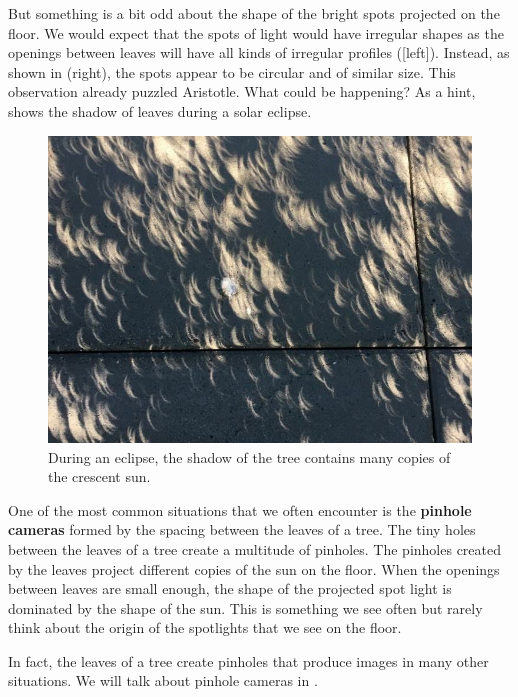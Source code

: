 But something is a bit odd about the shape of the bright spots projected on the floor. We would expect that the spots of light would have irregular shapes as the openings between leaves will have all kinds of irregular profiles (\fig{\ref{fig:tree_pinholes}}[left]). Instead, as shown in \fig{\ref{fig:tree_pinholes}}(right), the spots appear to be circular and of similar size. This observation already puzzled Aristotle. What could be happening?  As a hint, \fig{\ref{fig:tree_shadow_eclipse}} shows the shadow of leaves during a solar eclipse.


\begin{figure}[h!]
\centerline{
    \includegraphics[width=.9\linewidth]{figures/visionscience/tree_shadow_eclipse2.jpg} %
}
\caption{During an eclipse, the shadow of the tree contains many copies of the crescent sun.}
\label{fig:tree_shadow_eclipse}
\end{figure}


One of the most common situations that we often encounter is the {\bf pinhole cameras} formed by the spacing between the leaves of a tree. 
The tiny
holes between the leaves of a tree create a multitude of pinholes. The pinholes created by the leaves project different
copies of the sun on the floor. When the openings between leaves are small enough, the shape of the projected spot light is dominated by the shape of the sun.
This is something we see often but rarely think about the origin of the spotlights that we
see on the floor. 


    
    
In fact, the leaves of a tree create pinholes that produce images in many other situations. We will talk about pinhole cameras in \chap{\ref{chapter:imaging}}.

